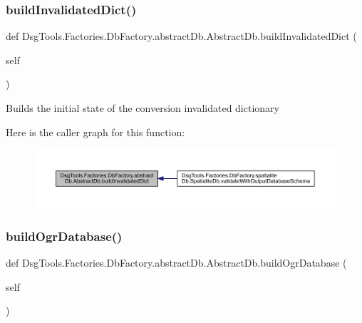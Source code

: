 \subsubsection{\texorpdfstring{build\+Invalidated\+Dict()}{buildInvalidatedDict()}}
{\footnotesize\ttfamily def Dsg\+Tools.\+Factories.\+Db\+Factory.\+abstract\+Db.\+Abstract\+Db.\+build\+Invalidated\+Dict (\begin{DoxyParamCaption}\item[{}]{self }\end{DoxyParamCaption})}

\begin{DoxyVerb}Builds the initial state of the conversion invalidated dictionary
\end{DoxyVerb}
 Here is the caller graph for this function\+:
\nopagebreak
\begin{figure}[H]
\begin{center}
\leavevmode
\includegraphics[width=350pt]{class_dsg_tools_1_1_factories_1_1_db_factory_1_1abstract_db_1_1_abstract_db_a544337a6752eae3f22d21610f4ce1dab_icgraph}
\end{center}
\end{figure}
\mbox{\label{class_dsg_tools_1_1_factories_1_1_db_factory_1_1abstract_db_1_1_abstract_db_ac38d68fbcc40e5bcc3fd95aec02ce76d}} 
\subsubsection{\texorpdfstring{build\+Ogr\+Database()}{buildOgrDatabase()}}
{\footnotesize\ttfamily def Dsg\+Tools.\+Factories.\+Db\+Factory.\+abstract\+Db.\+Abstract\+Db.\+build\+Ogr\+Database (\begin{DoxyParamCaption}\item[{}]{self }\end{DoxyParamCaption})}

